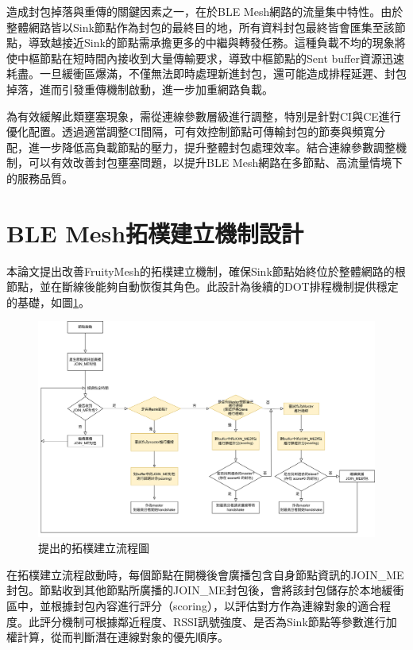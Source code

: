\begin{ZhChapter}
造成封包掉落與重傳的關鍵因素之一，在於BLE Mesh網路的流量集中特性。由於整體網路皆以Sink節點作為封包的最終目的地，所有資料封包最終皆會匯集至該節點，導致越接近Sink的節點需承擔更多的中繼與轉發任務。這種負載不均的現象將使中樞節點在短時間內接收到大量傳輸要求，導致中樞節點的Sent buffer資源迅速耗盡。一旦緩衝區爆滿，不僅無法即時處理新進封包，還可能造成排程延遲、封包掉落，進而引發重傳機制啟動，進一步加重網路負載。

為有效緩解此類壅塞現象，需從連線參數層級進行調整，特別是針對CI與CE進行優化配置。透過適當調整CI間隔，可有效控制節點可傳輸封包的節奏與頻寬分配，進一步降低高負載節點的壓力，提升整體封包處理效率。結合連線參數調整機制，可以有效改善封包壅塞問題，以提升BLE Mesh網路在多節點、高流量情境下的服務品質。

\clearpage

\section{BLE Mesh拓樸建立機制設計}

本論文提出改善FruityMesh的拓樸建立機制，確保Sink節點始終位於整體網路的根節點，並在斷線後能夠自動恢復其角色。此設計為後續的DOT排程機制提供穩定的基礎，如圖\ref{fig: 提出的拓樸建立流程圖}。

\begin{figure}[H]
    \centering
    \includegraphics[width = 1\textwidth]{image/build-up_pro2.png}
    \caption{提出的拓樸建立流程圖}
    \label{fig: 提出的拓樸建立流程圖}
\end{figure}

在拓樸建立流程啟動時，每個節點在開機後會廣播包含自身節點資訊的JOIN\_ME封包。節點收到其他節點所廣播的JOIN\_ME封包後，會將該封包儲存於本地緩衝區中，並根據封包內容進行評分（scoring），以評估對方作為連線對象的適合程度。此評分機制可根據鄰近程度、RSSI訊號強度、是否為Sink節點等參數進行加權計算，從而判斷潛在連線對象的優先順序。


\end{ZhChapter}
